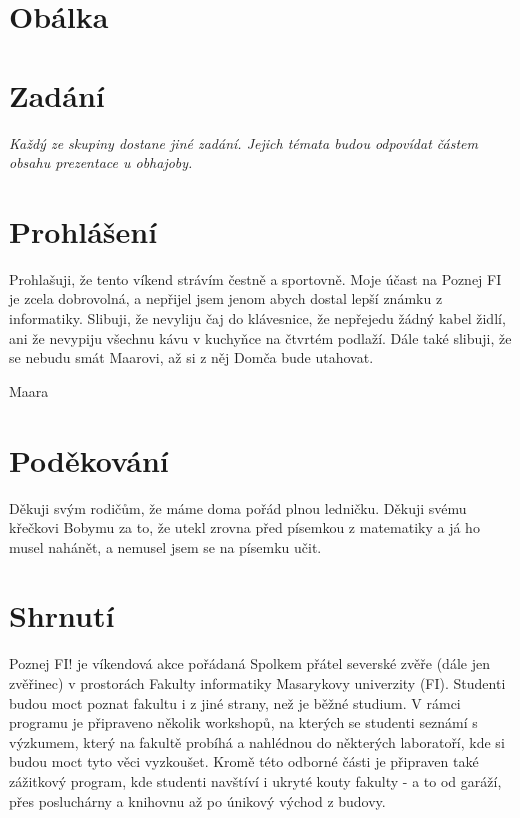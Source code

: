 \documentclass[]{article}
\def \studentname {Maara}
\begin{document}
\pagestyle{empty}


\section*{Obálka}

\pagebreak
\section*{Zadání}

\textit{Každý ze skupiny dostane jiné zadání. Jejich témata budou odpovídat částem obsahu prezentace u obhajoby.}

\pagebreak
\section*{Prohlášení}

Prohlašuji, že tento víkend strávím čestně a sportovně. Moje účast na Poznej FI je zcela dobrovolná, a nepřijel jsem jenom abych dostal lepší známku z informatiky. Slibuji, že nevyliju čaj do klávesnice, že nepřejedu žádný kabel židlí, ani že nevypiju všechnu kávu v kuchyňce na čtvrtém podlaží. Dále také slibuji, že se nebudu smát Maarovi, až si z něj Domča bude utahovat.

\vspace{20pt}
\hspace*{\fill}\studentname

\pagebreak
\section*{Poděkování}

Děkuji svým rodičům, že máme doma pořád plnou ledničku. Děkuji svému křečkovi Bobymu za to, že utekl zrovna před písemkou z matematiky a já ho musel nahánět, a nemusel jsem se na písemku učit. 

\pagebreak
\section*{Shrnutí}

Poznej FI! je víkendová akce pořádaná Spolkem přátel severské zvěře (dále jen zvěřinec) v prostorách Fakulty informatiky Masarykovy univerzity (FI). Studenti budou moct poznat fakultu i z jiné strany, než je běžné studium. V rámci programu je připraveno několik workshopů, na kterých se studenti seznámí s výzkumem, který na fakultě probíhá a nahlédnou do některých laboratoří, kde si budou moct tyto věci vyzkoušet. Kromě této odborné části je připraven také zážitkový program, kde studenti navštíví i ukryté kouty fakulty - a to od garáží, přes posluchárny a knihovnu až po únikový východ z budovy.
\end{document}
